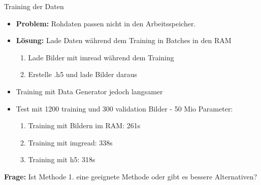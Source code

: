 \documentclass[aspectratio=1610, 9pt]{beamer}
\begin{document}
\begin{frame}{Training der Daten}
  \begin{itemize}
  \item \textbf{Problem:} Rohdaten passen nicht in den Arbeitsspeicher.
  \item \textbf{Lösung:} Lade Daten während dem Training in Batches in den RAM
    \begin{enumerate}
    \item Lade Bilder mit imread während dem Training
    \item Erstelle .h5 und lade Bilder daraus
    \end{enumerate}
  \item Training mit Data Generator jedoch langsamer
  \item Test mit 1200 training und 300 validation Bilder - 50 Mio Parameter:
    \begin{enumerate}
    \item Training mit Bildern im RAM: 261s
    \item Training mit imgread: 338s
    \item Training mit h5: 318s
    \end{enumerate}
  \end{itemize}
  \centering
  \LARGE
  \textbf{Frage:} Ist Methode 1. eine geeignete Methode oder gibt es bessere Alternativen?
\end{frame}
\end{document}
